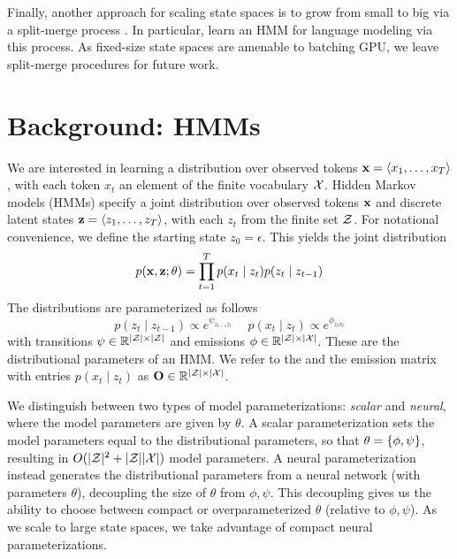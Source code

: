 \documentclass[11pt,a4paper]{article}
\begin{document}
Finally, another approach for scaling state spaces is to
grow from small to big via a split-merge process
\citep{petrov2006splitmerge,huang2011thesis}.
In particular, \citet{huang2011thesis} learn an HMM for language modeling
via this process.
As fixed-size state spaces are amenable to batching GPU,
we leave split-merge procedures for future work. 

\section{Background: HMMs}

We are interested in learning a distribution over observed tokens
$\mathbf{x} = \langle x_1, \ldots, x_T \rangle$, with each token $x_t$
an element of the finite vocabulary $\mathcal{X}$.
Hidden Markov models (HMMs) specify a joint distribution over 
observed tokens $\mathbf{x}$ and discrete latent states $\mathbf{z} = \langle z_1, \ldots, z_T \rangle$,
with each $z_t$ from the finite set $\mathcal{Z}$.
For notational convenience, we define the starting state $z_0=\epsilon$.
This yields the joint distribution
\begin{equation}
p(\mathbf{x}, \mathbf{z}; \theta)
= \prod_{t=1}^T p(x_t\mid z_t)p(z_t \mid z_{t-1})
\end{equation}
\noindent The distributions are parameterized as follows
\begin{equation}
\label{param}
p(z_t \mid z_{t-1}) \propto e^{\psi_{z_{t-1}z_t}} \quad \ p(x_t \mid z_t) \propto e^{\phi_{z_tx_t}}
\end{equation}
with transitions $\psi \in \mathbb{R}^{|\mathcal{Z}|\times|\mathcal{Z}|}$
and emissions $\phi \in \mathbb{R}^{|\mathcal{Z}| \times |\mathcal{X}|}$.
These are the distributional parameters of an HMM.
We refer to the
and the emission matrix with entries $p(x_t \mid z_t)$ as
$\mathbf{O} \in\mathbb{R}^{|\mathcal{Z}|\times|\mathcal{X}|}$.

We distinguish between two types of model parameterizations: \textit{scalar} and \textit{neural},
where the model parameters are given by $\theta$.
A scalar parameterization sets the model parameters equal to the distributional
parameters, so that $\theta = \left\{\phi,\psi\right\}$,
resulting in $O(|\mathcal{Z}|^2 + |\mathcal{Z}||\mathcal{X}|)$ model parameters.
A neural parameterization instead generates the distributional parameters
from a neural network (with parameters $\theta$),
decoupling the size of $\theta$ from $\phi,\psi$.
This decoupling gives us the ability to choose
between compact or overparameterized $\theta$ (relative to $\phi,\psi$).
As we scale to large state spaces,
we take advantage of compact neural parameterizations.
\end{document}
